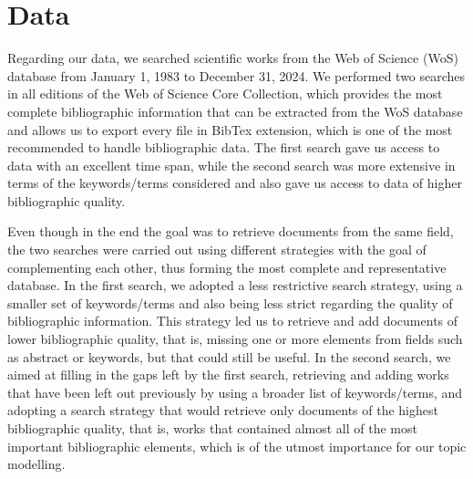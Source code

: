 \section{Data} \label{data}

Regarding our data, we searched scientific works from the Web of Science (WoS) database from January 1, 1983 to December 31, 2024. We performed two searches in all editions of the Web of Science Core Collection, which provides the most complete bibliographic information that can be extracted from the WoS database and allows us to export every file in BibTex extension, which is one of the most recommended to handle bibliographic data. The first search gave us access to data with an excellent time span, while the second search was more extensive in terms of the keywords/terms considered and also gave us access to data of higher bibliographic quality.

Even though in the end the goal was to retrieve documents from the same field, the two searches were carried out using different strategies with the goal of complementing each other, thus forming the most complete and representative database. In the first search, we adopted a less restrictive search strategy, using a smaller set of keywords/terms and also being less strict regarding the quality of bibliographic information. This strategy led us to retrieve and add documents of lower bibliographic quality, that is, missing one or more elements from fields such as abstract or keywords, but that could still be useful. In the second search, we aimed at filling in the gaps left by the first search, retrieving and adding works that have been left out previously by using a broader list of keywords/terms, and adopting a search strategy that would retrieve only documents of the highest bibliographic quality, that is, works that contained almost all of the most important bibliographic elements, which is of the utmost importance for our topic modelling.

